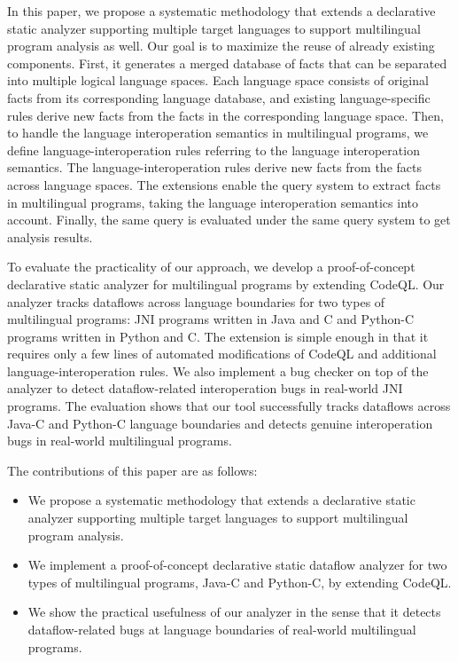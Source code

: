 In this paper, we propose a systematic methodology that extends a
declarative static analyzer supporting multiple target languages to support
multilingual program analysis as well. Our goal is to maximize the reuse of
already existing components. First, it generates a merged database of facts that can
be separated into multiple logical language spaces.  Each language space
consists of original facts from its corresponding language database, and existing
language-specific rules derive new facts from the facts in the corresponding
language space. Then, to handle the language interoperation semantics in
multilingual programs, we define language-interoperation rules referring to
the language interoperation semantics. The language-interoperation rules derive new
facts from the facts across language spaces. The extensions enable the query system
to extract facts in multilingual programs, taking the language
interoperation semantics into account.
Finally, the same query is evaluated under the same query system to get
analysis results.

To evaluate the practicality of our approach, we develop a proof-of-concept
declarative static analyzer for multilingual programs by extending CodeQL. Our
analyzer tracks dataflows across language boundaries for two types of
multilingual programs: JNI programs written in Java and C and Python-C
programs written in Python and C. The extension is simple enough in that
it requires only a few lines of automated modifications of CodeQL and additional
language-interoperation rules. We also implement a bug checker on top of
the analyzer to detect dataflow-related interoperation bugs in real-world JNI programs.
The evaluation shows that our tool successfully tracks dataflows across
Java-C and Python-C language boundaries and detects genuine interoperation
bugs in real-world multilingual programs.

The contributions of this paper are as follows:
\begin{itemize}
\item We propose a systematic methodology that extends a declarative static analyzer
supporting multiple target languages to support multilingual program analysis.

\item We implement a proof-of-concept declarative static dataflow analyzer for two
types of multilingual programs, Java-C and Python-C, by extending CodeQL.

\item We show the practical usefulness of our analyzer in the sense that it detects
dataflow-related bugs at language boundaries of real-world multilingual
programs.
\end{itemize}

